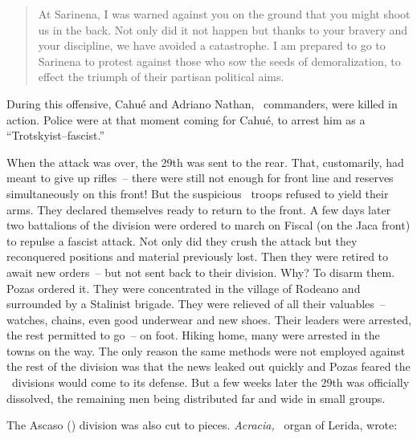 \begin{quotation}
  At Sarinena, I was warned against you on the ground that you might shoot us in the back. Not only did it not happen but thanks to your bravery and your discipline, we have avoided a catastrophe. I am prepared to go to Sarinena to protest against those who sow the seeds of demoralization, to effect the triumph of their partisan political aims.
\end{quotation}

\indexPOUM{}
During this offensive, Cahué and Adriano Nathan, \POUM\ commanders, were killed in action. Police were at that moment coming for Cahué, to arrest him as a ``Trotskyist--fascist.\kn\kn''

\indexSPozas{}\indexPOUM{}
When the attack was over, the 29th was sent to the rear. That, customarily, had meant to give up rifles~-- there were still not enough for front line and reserves simultaneously on this front! But the suspicious \POUM\ troops refused to yield their arms. They declared themselves ready to return to the front. A few days later two battalions of the division were ordered to march on Fiscal (on the Jaca front) to repulse a fascist attack. Not only did they crush the attack but they reconquered positions and material previously lost. Then they were retired to await new orders~-- but not sent back to their division. Why? To disarm them. Pozas ordered it. They were concentrated in the village of Rodeano and surrounded by a Stalinist brigade. They were relieved of all their valuables~-- watches, chains, even good underwear and new shoes. Their leaders were arrested, the rest permitted to go~-- on foot. Hiking home, many were arrested in the towns on the way\kn. The only reason the same methods were not employed against the rest of the division was that the news leaked out quickly and Pozas feared the \CNT\ divisions would come to its defense. But a few weeks later the 29th was officially dissolved, the remaining men being distributed far and wide in small groups.\kn\kn{}

\medskip

\indexCNT
The Ascaso (\CNT) division was also cut to pieces. \emph{Acracia,} \CNT\ organ of Lerida, wrote:

